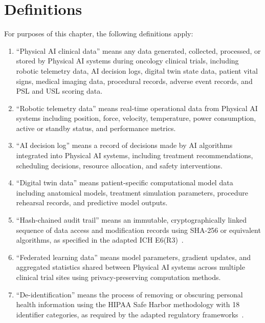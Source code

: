 \section{Definitions}

For purposes of this chapter, the following definitions apply:

\begin{enumerate}[label=(\alph*)]
\item ``Physical AI clinical data'' means any data generated, collected,
  processed, or stored by Physical AI systems during oncology clinical trials,
  including robotic telemetry data, AI decision logs, digital twin state data,
  patient vital signs, medical imaging data, procedural records, adverse event
  records, and PSL and USL scoring data.

\item ``Robotic telemetry data'' means real-time operational data from Physical
  AI systems including position, force, velocity, temperature, power
  consumption, active or standby status, and performance metrics.

\item ``AI decision log'' means a record of decisions made by AI algorithms
  integrated into Physical AI systems, including treatment recommendations,
  scheduling decisions, resource allocation, and safety interventions.

\item ``Digital twin data'' means patient-specific computational model data
  including anatomical models, treatment simulation parameters, procedure
  rehearsal records, and predictive model outputs.

\item ``Hash-chained audit trail'' means an immutable, cryptographically linked
  sequence of data access and modification records using SHA-256 or equivalent
  algorithms, as specified in the adapted ICH E6(R3)~\cite{iche6r3adapt}.

\item ``Federated learning data'' means model parameters, gradient updates, and
  aggregated statistics shared between Physical AI systems across multiple
  clinical trial sites using privacy-preserving computation methods.

\item ``De-identification'' means the process of removing or obscuring personal
  health information using the HIPAA Safe Harbor methodology with 18
  identifier categories, as required by the adapted regulatory
  frameworks~\cite{cfr50adapt}.
\end{enumerate}

